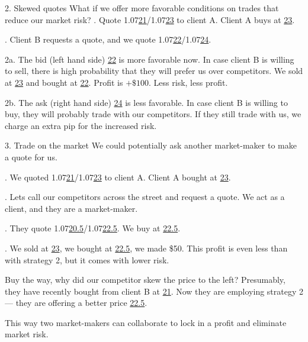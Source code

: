 \documentclass{beamer}
\begin{document}
\begin{frame}{2. Skewed quotes}
\justify
What if we offer more favorable conditions on trades that reduce our market risk?
. Quote 1.07\underline{21}/1.07\underline{23} to client A. Client A buys at \underline{23}.

. Client B requests a quote, and we quote 1.07\underline{22}/1.07\underline{24}.

\justify
2a. The bid (left hand side) \underline{22} is more favorable now. In case client B is willing to sell, there is high probability that they will prefer us over competitors. We sold at \underline{23} and bought at \underline{22}. Profit is $+\$100$. Less risk, less profit.

\justify
2b. The ask (right hand side) \underline{24} is less favorable. In case client B is willing to buy, they will probably trade with our competitors. If they still trade with us, we charge an extra pip for the increased risk.
\end{frame}



\begin{frame}{3. Trade on the market }
\justify
We could potentially ask another market-maker to make a quote for us.

. We quoted 1.07\underline{21}/1.07\underline{23} to client A. Client A bought at \underline{23}.

. Lets call our competitors across the street and request a quote. We act as a client, and they are a market-maker.

. They quote 1.07\underline{20.5}/1.07\underline{22.5}. We buy at \underline{22.5}.

. We sold at \underline{23}, we bought at \underline{22.5}, we made \$50. This profit is even less than with strategy 2, but it comes with lower risk.

\justify
Buy the way, why did our competitor skew the price to the left? Presumably, they have recently bought from client B at \underline{21}. Now they are employing strategy 2 --- they are offering a better price \underline{22.5}.

\justify
This way two market-makers can collaborate to lock in a profit and eliminate market risk.
\end{frame}
\end{document}

